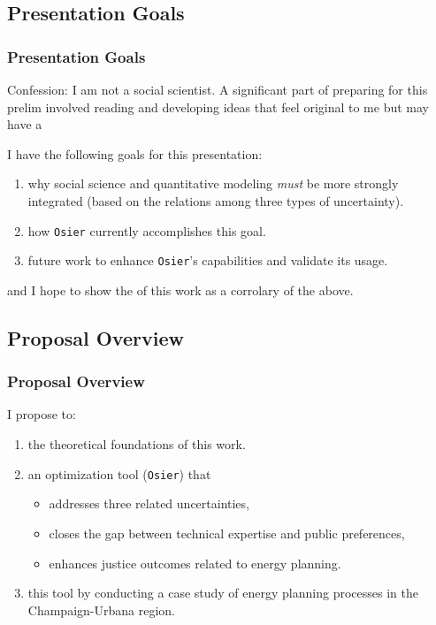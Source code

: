 \subsection{Presentation Goals}
\begin{frame}
    \frametitle{Presentation Goals}
    Confession: I am not a social scientist. A significant part of preparing for this prelim involved reading and developing ideas
    that feel original to me but may have a 


    I have the following goals for this presentation:

    \begin{enumerate}
        \item {} why social science and quantitative modeling \textit{must} be more strongly integrated 
        (based on the relations among three types of uncertainty).
        \item {} how \texttt{Osier} currently accomplishes this goal.
        \item {} future work to enhance \texttt{Osier}'s capabilities and validate its usage.
    \end{enumerate}

    and I hope to show the  of this work as a corrolary of the above.

\end{frame}
\subsection{Proposal Overview}
\begin{frame}
    \frametitle{Proposal Overview}

    I propose to:

    \begin{enumerate}
        \item {} the theoretical foundations of this work.
        \item {} an optimization tool (\texttt{Osier}) that
        \begin{itemize}
            \item addresses three related uncertainties,
            \item closes the gap between technical expertise and public preferences,
            \item enhances justice outcomes related to energy planning.
        \end{itemize}
        \item {} this tool by conducting a case study of energy planning processes
        in the Champaign-Urbana region.
    \end{enumerate}

\end{frame}

